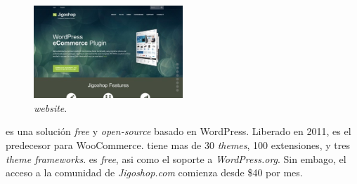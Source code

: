 \subsection{\nameJigoshop}

\begin{figure}[h!]
	\centering
	\includegraphics[width=0.5\textwidth]{figuras/cap1/JigoshopWebsite.jpg}
	\caption{\nameJigoshop \textit{website}\cite{online_Jigoshop}.}
\end{figure}

\nameJigoshop es una solución \ecommerce \textit{free} y \textit{open-source} basado en WordPress. Liberado en 2011, \nameJigoshop es el predecesor para WooCommerce. \nameJigoshop tiene mas de 30   \textit{themes}, 100 extensiones, y tres \textit{theme frameworks}. \nameJigoshop es  \textit{free}, asi como el soporte a \textit{WordPress.org}. Sin embago, el acceso a la comunidad de \textit{Jigoshop.com} comienza desde \$40 por mes.


